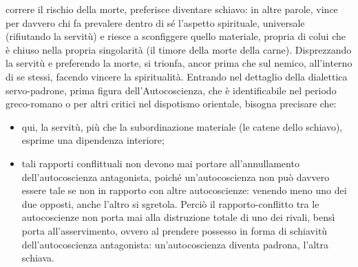 \documentclass[a4paper,12pt,oneside,openany]{book}%
\begin{document}
correre il rischio della morte, preferisce diventare schiavo: in altre parole, vince per davvero chi fa prevalere dentro di sé l’aspetto spirituale, universale (rifiutando la servitù) e riesce a sconfiggere quello materiale, propria di colui che è chiuso nella propria singolarità (il timore della morte della carne). Disprezzando la servitù e preferendo la morte, si trionfa, ancor prima che sul nemico, all’interno di se stessi, facendo vincere la spiritualità. Entrando nel dettaglio della dialettica servo-padrone, prima figura dell’Autocoscienza, che è identificabile nel periodo greco-romano o per altri critici nel dispotismo orientale, bisogna precisare che:

\begin{itemize}
	\item qui, la servitù, più che la subordinazione materiale (le catene dello schiavo), esprime una dipendenza interiore;
	\item tali rapporti conflittuali non devono mai portare all’annullamento dell’autocoscienza antagonista, poiché un’autocoscienza non può davvero essere tale se non in rapporto con altre autocoscienze: venendo meno uno dei due opposti, anche l’altro si sgretola. Perciò il rapporto-conflitto tra le autocoscienze non porta mai alla distruzione totale di uno dei rivali, bensì porta all’asservimento, ovvero al prendere possesso in forma di schiavitù dell’autocoscienza antagonista: un’autocoscienza diventa padrona, l’altra schiava.
\end{itemize}
	
\end{document}
